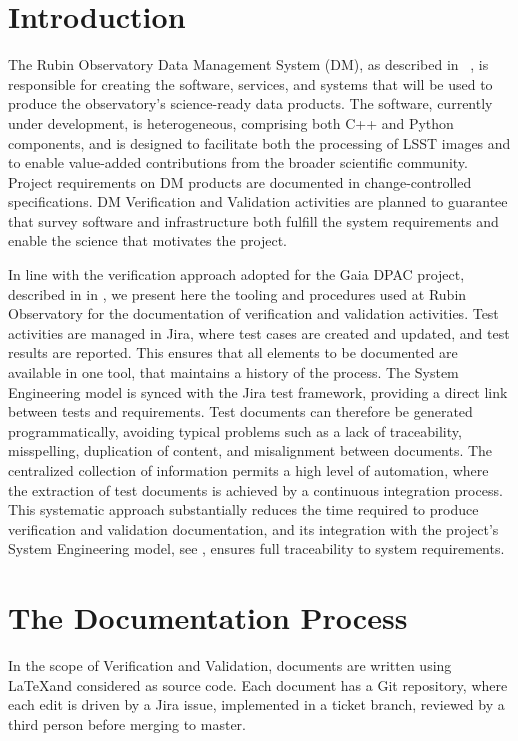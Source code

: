 \section{Introduction}

The Rubin Observatory Data Management System (DM), as described in~\cite{2015arXiv151207914J} ,
is responsible for creating the software, services, and systems that will be used to
produce the observatory's science-ready data products. The software, currently under development, is heterogeneous,
comprising both C++ and Python components, and is designed to facilitate both the processing of LSST images
and to enable value-added contributions from the broader scientific community. Project requirements on DM
products are documented in change-controlled specifications. DM Verification and Validation activities are planned
to guarantee that survey software and infrastructure both fulfill the system requirements and enable the science that
motivates the project.

In line with the verification approach adopted for the Gaia DPAC project, described in in \cite{10.1117/12.926797} , 
we present here the tooling and procedures used at Rubin Observatory for the documentation of verification and
validation activities. Test activities are managed in Jira, where test cases are created and updated, and test results
are reported. This ensures that all elements to be documented are available in one tool, that maintains a history of
the process. The System Engineering model is synced with the Jira test framework, providing a direct link between
tests and requirements. Test documents can therefore be generated programmatically, avoiding typical problems
such as a lack of traceability, misspelling, duplication of content, and misalignment between documents. The
centralized collection of information permits a high level of automation, where the extraction of test documents is
achieved by a continuous integration process. This systematic approach substantially reduces the time required to
produce verification and validation documentation, and its integration with the project's System Engineering model, 
see \cite{10.1117/12.2310125} , ensures full traceability to system requirements.

\section{The Documentation Process}

In the scope of Verification and Validation, documents are written using \LaTeX and considered as source code.
Each document has a Git repository, where each edit is driven by a Jira issue, implemented in a ticket branch, 
reviewed by a third person before merging to master.

